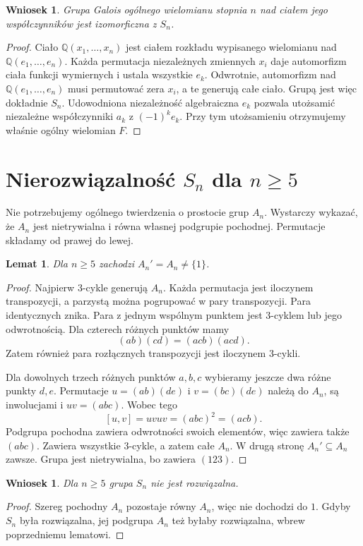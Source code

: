 \documentclass[11pt,a4paper,oneside]{book}
\numberwithin{equation}{section}
\theoremstyle{plain}
\newtheorem{lemat}[twierdzenie]{Lemat}
\newtheorem{wniosek}[twierdzenie]{Wniosek}
\theoremstyle{definition}
\theoremstyle{remark}
\newcommand{\Q}{\mathbb{Q}}
\begin{document}
\begin{wniosek}
Grupa Galois ogólnego wielomianu stopnia $n$ nad ciałem jego współczynników jest izomorficzna z $S_n$.
\end{wniosek}
\begin{proof}
Ciało $\Q(x_1,\dots,x_n)$ jest ciałem rozkładu wypisanego wielomianu nad $\Q(e_1,\dots,e_n)$. Każda permutacja niezależnych zmiennych $x_i$ daje automorfizm ciała funkcji wymiernych i ustala wszystkie $e_k$. Odwrotnie, automorfizm nad $\Q(e_1,\dots,e_n)$ musi permutować zera $x_i$, a te generują całe ciało. Grupą jest więc dokładnie $S_n$. Udowodniona niezależność algebraiczna $e_k$ pozwala utożsamić niezależne współczynniki $a_k$ z $(-1)^ke_k$. Przy tym utożsamieniu otrzymujemy właśnie ogólny wielomian $F$.
\end{proof}

\section{Nierozwiązalność $S_n$ dla $n\ge5$}

Nie potrzebujemy ogólnego twierdzenia o prostocie grup $A_n$. Wystarczy wykazać, że $A_n$ jest nietrywialna i równa własnej podgrupie pochodnej. Permutacje składamy od prawej do lewej.

\begin{lemat}
Dla $n\ge5$ zachodzi $A_n'=A_n\ne\{1\}$.
\end{lemat}
\begin{proof}
Najpierw $3$-cykle generują $A_n$. Każda permutacja jest iloczynem transpozycji, a parzystą można pogrupować w pary transpozycji. Para identycznych znika. Para z jednym wspólnym punktem jest $3$-cyklem lub jego odwrotnością. Dla czterech różnych punktów mamy
\[
(ab)(cd)=(acb)(acd).
\]
Zatem również para rozłącznych transpozycji jest iloczynem $3$-cykli.

Dla dowolnych trzech różnych punktów $a,b,c$ wybieramy jeszcze dwa różne punkty $d,e$. Permutacje $u=(ab)(de)$ i $v=(bc)(de)$ należą do $A_n$, są inwolucjami i $uv=(abc)$. Wobec tego
\[
[u,v]=uvuv=(abc)^2=(acb).
\]
Podgrupa pochodna zawiera odwrotności swoich elementów, więc zawiera także $(abc)$. Zawiera wszystkie $3$-cykle, a zatem całe $A_n$. W drugą stronę $A_n'\subseteq A_n$ zawsze. Grupa jest nietrywialna, bo zawiera $(123)$.
\end{proof}

\begin{wniosek}
Dla $n\ge5$ grupa $S_n$ nie jest rozwiązalna.
\end{wniosek}
\begin{proof}
Szereg pochodny $A_n$ pozostaje równy $A_n$, więc nie dochodzi do $1$. Gdyby $S_n$ była rozwiązalna, jej podgrupa $A_n$ też byłaby rozwiązalna, wbrew poprzedniemu lematowi.
\end{proof}
\end{document}
